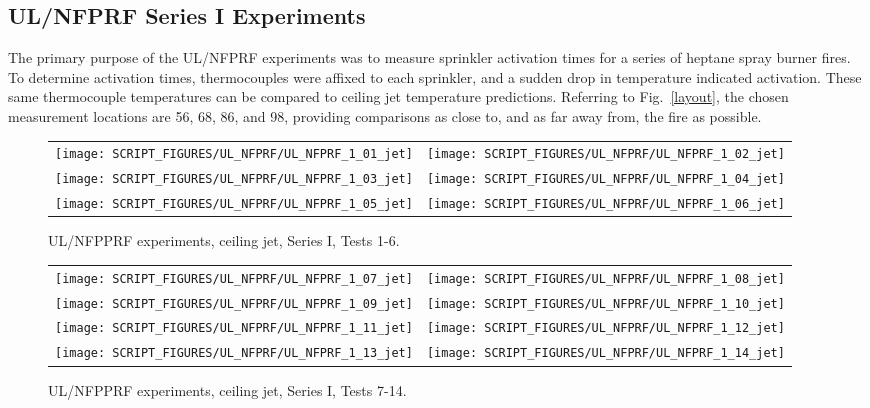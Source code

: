 \clearpage

\subsection{UL/NFPRF Series I Experiments}

The primary purpose of the UL/NFPRF experiments was to measure sprinkler activation times for a series of heptane spray burner fires. To determine activation times, thermocouples were affixed to each sprinkler, and a sudden drop in temperature indicated activation. These same thermocouple temperatures can be compared to ceiling jet temperature predictions. Referring to Fig.~\ref{layout}, the chosen measurement locations are 56, 68, 86, and 98, providing comparisons as close to, and as far away from, the fire as possible.


\begin{figure}[h!]
\begin{tabular*}{\textwidth}{l@{\extracolsep{\fill}}r}
\texttt{[image: SCRIPT\_FIGURES/UL\_NFPRF/UL\_NFPRF\_1\_01\_jet]} &
\texttt{[image: SCRIPT\_FIGURES/UL\_NFPRF/UL\_NFPRF\_1\_02\_jet]} \\
\texttt{[image: SCRIPT\_FIGURES/UL\_NFPRF/UL\_NFPRF\_1\_03\_jet]} &
\texttt{[image: SCRIPT\_FIGURES/UL\_NFPRF/UL\_NFPRF\_1\_04\_jet]} \\
\texttt{[image: SCRIPT\_FIGURES/UL\_NFPRF/UL\_NFPRF\_1\_05\_jet]} &
\texttt{[image: SCRIPT\_FIGURES/UL\_NFPRF/UL\_NFPRF\_1\_06\_jet]}
\end{tabular*}
\caption{UL/NFPPRF experiments, ceiling jet, Series I, Tests 1-6.}
\label{UL_NFPRF_jet_1}
\end{figure}

\newpage

\begin{figure}[p]
\begin{tabular*}{\textwidth}{l@{\extracolsep{\fill}}r}
\texttt{[image: SCRIPT\_FIGURES/UL\_NFPRF/UL\_NFPRF\_1\_07\_jet]} &
\texttt{[image: SCRIPT\_FIGURES/UL\_NFPRF/UL\_NFPRF\_1\_08\_jet]} \\
\texttt{[image: SCRIPT\_FIGURES/UL\_NFPRF/UL\_NFPRF\_1\_09\_jet]} &
\texttt{[image: SCRIPT\_FIGURES/UL\_NFPRF/UL\_NFPRF\_1\_10\_jet]} \\
\texttt{[image: SCRIPT\_FIGURES/UL\_NFPRF/UL\_NFPRF\_1\_11\_jet]} &
\texttt{[image: SCRIPT\_FIGURES/UL\_NFPRF/UL\_NFPRF\_1\_12\_jet]} \\
\texttt{[image: SCRIPT\_FIGURES/UL\_NFPRF/UL\_NFPRF\_1\_13\_jet]} &
\texttt{[image: SCRIPT\_FIGURES/UL\_NFPRF/UL\_NFPRF\_1\_14\_jet]}
\end{tabular*}
\caption{UL/NFPPRF experiments, ceiling jet, Series I, Tests 7-14.}
\label{UL_NFPRF_jet_2}
\end{figure}

